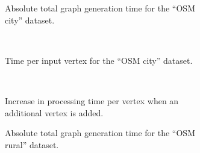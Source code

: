 			\begin{figure}[h!]
				\begin{minipage}{.48\textwidth}
					\begin{subfigure}[t]{\linewidth}
						\begin{figcenter}
							
						\end{figcenter}
						\caption{Absolute total graph generation time for the \enquote{OSM city} dataset.}
						\label{fig:eval-import-city-abs}
					\end{subfigure}
					\\[3ex]
					\begin{subfigure}[t]{\linewidth}
						\begin{figcenter}
							
						\end{figcenter}
						\caption{Time per input vertex for the \enquote{OSM city} dataset.}
					\end{subfigure}
					\\[3ex]
					\begin{subfigure}[t]{\linewidth}
						\begin{figcenter}
							
						\end{figcenter}
						\caption{Increase in processing time per vertex when an additional vertex is added.}
						\label{fig:eval-import-city-rel-increase}
					\end{subfigure}
					\caption{Graph generation times using the \enquote{OSM city} dataset.}
					\label{fig:eval-import-city}
				\end{minipage}
				\hfill
				\begin{minipage}{.48\textwidth}
					\begin{subfigure}[t]{\linewidth}
						\begin{figcenter}
							
						\end{figcenter}
						\caption{Absolute total graph generation time for the \enquote{OSM rural} dataset.}
						\label{fig:eval-import-rural-abs}
					\end{subfigure}
					\\[3ex]
					\begin{subfigure}[t]{\linewidth}
						\begin{figcenter}

\end{figcenter}
\end{subfigure}
\end{minipage}
\end{figure}
